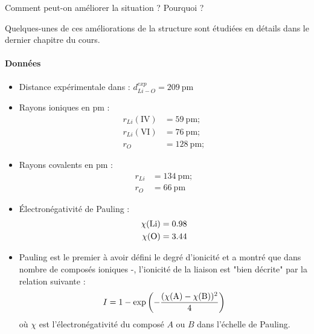 \Q Comment peut-on améliorer la situation ? Pourquoi ? 

Quelques-unes de ces améliorations de la structure  sont étudiées en détails dans le dernier chapitre du cours.

\paragraph*{Données}
\begin{itemize}
\item Distance expérimentale  dans  : $d^{exp}_{Li-O} = 209 ~ \si{\pico\meter}$   
\item Rayons ioniques en \si{\pico\meter} : 
\begin{align*}
r_{Li} ( \text{IV} ) &= 59 ~ \si{\pico\meter} ; \\
r_{Li} ( \text{VI} ) &= 76 ~ \si{\pico\meter} ; \\
r_{O} &= 128 ~ \si{\pico\meter} ;
\end{align*}
\item Rayons covalents en \si{\pico\meter} : 
\begin{align*}
r_{Li} &= 134 ~ \si{\pico\meter} ; \\
r_{O} &= 66 ~ \si{\pico\meter}
\end{align*}
\item \'{E}lectronégativité de Pauling : 
\begin{align*}
\chi ( \ce{Li} ) &= 0.98 \\
\chi ( \ce{O} ) &= 3.44 \\
\end{align*}
\item Pauling est le premier à avoir défini le degré d'ionicité et a montré que dans nombre de composés ioniques -, l'ionicité de la liaison est "bien décrite" par la relation suivante : 
\begin{align*}
I = 1 - \exp \left( - \frac{( \chi (\ce{A}) - \chi (\ce{B}))^2}{4} \right)
\end{align*}
où $\chi$ est l'électronégativité du composé $A$ ou $B$ dans l'échelle de Pauling.
\end{itemize}
